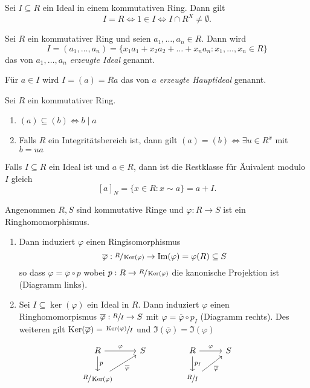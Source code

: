 \begin{lemma}
	Sei $I \subseteq R$ ein Ideal in einem kommutativen Ring. Dann gilt 
	\[
	I = R \Leftrightarrow 1 \in I \Leftrightarrow I \cap R^{X} \neq \emptyset
	.\] 
\end{lemma}



\begin{definition}
	Sei $R$ ein kommutativer Ring und seien $a_1,\ldots,a_{n} \in R$. Dann wird
	\[
		I = (a_1,\ldots,a_{n}) = \{x_1 a_1 + x_2 a_2 + \ldots + x_{n} a_{n} : x_1,\ldots,x_{n} \in R\} 
	\] 
	das von $a_1,\ldots,a_{n}$ \emph{erzeugte Ideal} genannt.

	Für $a \in I$ wird $I = (a) = Ra$ das von $a$ \emph{erzeugte Hauptideal} genannt.
\end{definition}

\begin{lemma}
	Sei $R$ ein kommutativer Ring.
	\begin{enumerate}[1)]
		\item $(a) \subseteq (b) \Leftrightarrow b \mid a$ 
		\item Falls $R $ ein Integritätsbereich ist, dann gilt $(a) = (b) \Leftrightarrow \exists u \in R^{x}$ mit $b = ua$
	\end{enumerate}
\end{lemma}



Falls $I \subseteq R$ ein Ideal ist und $a \in R$, dann ist die Restklasse für Äuivalent modulo $I$ gleich
\[
	[a]_{N} = \{x \in R: x \sim a\} = a + I
.\] 

\begin{theorem}
	Angenommen $R,S$ sind kommutative Ringe und $\varphi: R  \to S$ ist ein Ringhomomorphismus.
	\begin{enumerate}
		\item Dann induziert $\varphi$ einen Ringisomorphismus
			\[
				\overline{\varphi}: \sfrac{R}{\operatorname{Ker}(\varphi)} \to \Im(\varphi) = \varphi(R) \subseteq S
			\] 
			so dass $\varphi = \overline{\varphi} \circ p$ wobei $p : R \to \sfrac{R}{\operatorname{Ker}(\varphi)}$ die kanonische Projektion ist (Diagramm links).
		\item Sei $I \subseteq \ker(\varphi)$ ein Ideal in $R$.
			Dann induziert $\varphi$ einen Ringhomomorpismus $\overline{\varphi}: \sfrac{R}{I} \to S$ mit $\varphi = \overline{\varphi} \circ p_{I}$ (Diagramm rechts).
			Des weiteren gilt $\operatorname{Ker}(\overline{\varphi}) = \sfrac{\operatorname{Ker}(\varphi)}{I}$ und $\Im(\overline{\varphi}) = \Im(\varphi)$
	\end{enumerate}
	\[
	\begin{tikzcd}
		R \arrow[d, "p"] \arrow[r, "\varphi"]                      & S \\
		\sfrac{R}{\ker(\varphi)} \arrow[ru, "\overline{\varphi}"'] &  
	\end{tikzcd}\qquad\qquad
	\begin{tikzcd}
		R \arrow[d, "p_{I}"] \arrow[r, "\varphi"]      & S \\
		\sfrac{R}{I} \arrow[ru, "\overline{\varphi}"'] &  
	\end{tikzcd}
	\]
\end{theorem}


